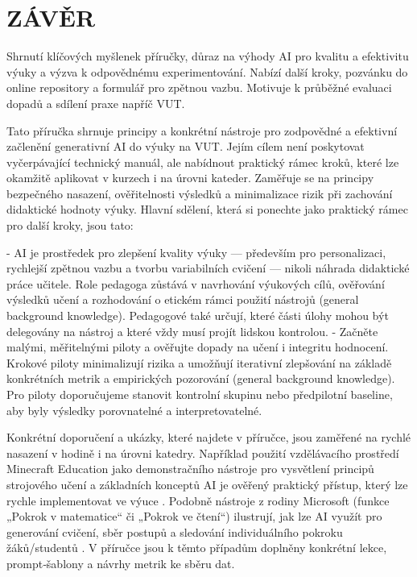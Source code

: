\documentclass{report}%
\begin{document}
%
\chapter{ZÁVĚR}%
Shrnutí klíčových myšlenek příručky, důraz na výhody AI pro kvalitu a efektivitu výuky a výzva k odpovědnému experimentování. Nabízí další kroky, pozvánku do online repository a formulář pro zpětnou vazbu. Motivuje k průběžné evaluaci dopadů a sdílení praxe napříč VUT.%


%
Tato příručka shrnuje principy a konkrétní nástroje pro zodpovědné a efektivní začlenění generativní AI do výuky na VUT. Jejím cílem není poskytovat vyčerpávající technický manuál, ale nabídnout praktický rámec kroků, které lze okamžitě aplikovat v kurzech i na úrovni kateder. Zaměřuje se na principy bezpečného nasazení, ověřitelnosti výsledků a minimalizace rizik při zachování didaktické hodnoty výuky. Hlavní sdělení, která si ponechte jako praktický rámec pro další kroky, jsou tato:

- AI je prostředek pro zlepšení kvality výuky — především pro personalizaci, rychlejší zpětnou vazbu a tvorbu variabilních cvičení — nikoli náhrada didaktické práce učitele. Role pedagoga zůstává v navrhování výukových cílů, ověřování výsledků učení a rozhodování o etickém rámci použití nástrojů (general background knowledge). Pedagogové také určují, které části úlohy mohou být delegovány na nástroj a které vždy musí projít lidskou kontrolou.
- Začněte malými, měřitelnými piloty a ověřujte dopady na učení i integritu hodnocení. Krokové piloty minimalizují rizika a umožňují iterativní zlepšování na základě konkrétních metrik a empirických pozorování (general background knowledge). Pro piloty doporučujeme stanovit kontrolní skupinu nebo předpilotní baseline, aby byly výsledky porovnatelné a interpretovatelné.

Konkrétní doporučení a ukázky, které najdete v příručce, jsou zaměřené na rychlé nasazení v hodině i na úrovni katedry. Například použití vzdělávacího prostředí Minecraft Education jako demonstračního nástroje pro vysvětlení principů strojového učení a základních konceptů AI je ověřený praktický přístup, který lze rychle implementovat ve výuce \cite{kb_ai_101_tipu_pdf_04e4a115_page_15_2}. Podobně nástroje z rodiny Microsoft (funkce „Pokrok v matematice“ či „Pokrok ve čtení“) ilustrují, jak lze AI využít pro generování cvičení, sběr postupů a sledování individuálního pokroku žáků/studentů \cite{kb_ai_101_tipu_pdf_04e4a115_page_8_1, kb_ai_101_tipu_pdf_04e4a115_page_7_1}. V příručce jsou k těmto případům doplněny konkrétní lekce, prompt‑šablony a návrhy metrik ke sběru dat.
\end{document}
